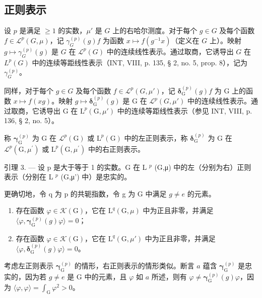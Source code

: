 \subsection{正则表示}

设 \(p\) 是满足 \(\geqslant 1\) 的实数，\(\mu'\) 是 \(G\) 上的右哈尔测度。对于每个 \(g \in G\) 及每个函数 \(f \in \mathcal{L}^p(G, \mu)\)，记 \(\gamma_G^{(p)}(g)f\) 为函数 \(x \mapsto f(g^{-1}x)\)（定义在 \(G\) 上）。映射 \(g \mapsto \gamma_G^{(p)}(g)\) 是 \(G\) 在 \(\mathcal{L}^p(G)\) 中的连续线性表示。通过取商，它诱导出 \(G\) 在 \(L^p(G)\) 中的连续等距线性表示（INT, VIII, p. 135, § 2, no. 5, prop. 8），记为 \(\gamma_G^{(p)}\)。

同样，对于每个 \(g \in G\) 及每个函数 \(f \in \mathcal{L}^{p}(G, \mu')\)，记 \(\boldsymbol{\delta}_{\mathrm{G}}^{(p)}(g)f\) 为 G 上的函数 \(x \mapsto f(xg)\)。映射 \(g \mapsto \boldsymbol{\delta}_{\mathrm{G}}^{(p)}(g)\) 是 G 在 \(\mathcal{L}^{p}(G, \mu')\) 中的连续线性表示。通过取商，它诱导出 G 在 \(\mathrm{L}^{p}(\mathrm{G}, \mu')\) 中的连续等距线性表示（参见 INT, VIII, p. 136, § 2, no. 5）。

称 \(\boldsymbol{\gamma}_{\mathrm{G}}^{(p)}\) 为 G 在 \(\mathcal{L}^{p}(\mathrm{G})\) 或 \(\mathrm{L}^{p}(\mathrm{G})\) 中的左正则表示，称 \(\boldsymbol{\delta}_{\mathrm{G}}^{(p)}\) 为 G 在 \(\mathcal{L}^{p}(\mathrm{G},\mu^{\prime})\) 或 \(\mathrm{L}^{p}(\mathrm{G},\mu^{\prime})\) 中的右正则表示。

引理 3. — 设 p 是大于等于 1 的实数。G 在 L \(^{p}\) (G,μ) 中的左（分别为右）正则表示（分别在 L \(^{p}\) (G,μ') 中）是忠实的。

更确切地，令 q 为 p 的共轭指数，令 g 为 G 中满足 \(g \neq e\) 的元素。

\begin{enumerate}
\def\labelenumi{\alph{enumi})}
\item
  存在函数 \(\varphi\in\mathcal{K}(\mathrm{G})\)，它在 \(\mathrm{L}^{q}(\mathrm{G},\mu)\) 中为正且非零，并满足 \(\langle\varphi,\boldsymbol{\gamma}_{\mathrm{G}}^{(p)}(g)\varphi\rangle=0\)；
\item
  存在函数 \(\varphi\in\mathcal{K}(\mathrm{G})\)，它在 \(\mathrm{L}^{q}(\mathrm{G},\mu')\) 中为正且非零，并满足 \(\langle\varphi,\boldsymbol{\delta}_{\mathrm{G}}^{(p)}(g)\varphi\rangle=0\)。
\end{enumerate}

考虑左正则表示 \(\boldsymbol{\gamma}_{\mathrm{G}}^{(p)}\) 的情形，右正则表示的情形类似。断言 \(a\) 蕴含 \(\boldsymbol{\gamma}_{\mathrm{G}}^{(p)}\) 是忠实的，因为若 \(g \neq e\) 是 G 中的元素，且 \(\varphi\) 如 \(a\) 所述，则有 \(\varphi \neq \boldsymbol{\gamma}_{\mathrm{G}}^{(p)}(g)\varphi\)，因为 \(\langle \varphi, \varphi \rangle = \int_{\mathrm{G}} \varphi^2 > 0\)。

